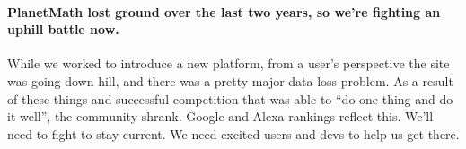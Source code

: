 \paragraph{PlanetMath lost ground over the last two years, so we're fighting
  an uphill battle now.} While we worked to introduce a new platform,
from a user's perspective the site was going down hill, and there was
a pretty major data loss problem.  As a result of these things and
successful competition that was able to ``do one thing and do it
well'', the community shrank.  Google and Alexa rankings reflect this.
We'll need to fight to stay current.  We need excited users and devs
to help us get there.


